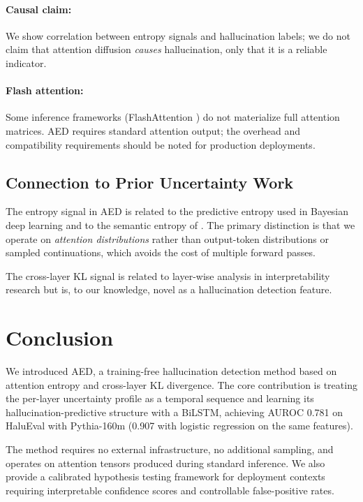 \documentclass[11pt]{article}
\begin{document}
\paragraph{Causal claim:}
We show correlation between entropy signals and hallucination labels; 
we do not claim that attention diffusion \emph{causes} hallucination, 
only that it is a reliable indicator.

\paragraph{Flash attention:}
Some inference frameworks (FlashAttention \citep{dao2022flashattention}) 
do not materialize full attention matrices. AED requires standard attention 
output; the overhead and compatibility requirements should be noted for 
production deployments.

\subsection{Connection to Prior Uncertainty Work}

The entropy signal in AED is related to the predictive entropy used in 
Bayesian deep learning \citep{gal2016dropout} and to the semantic entropy 
of \citet{kuhn2023semantic}. The primary distinction is that we operate on 
\emph{attention distributions} rather than output-token distributions or 
sampled continuations, which avoids the cost of multiple forward passes.

The cross-layer KL signal is related to layer-wise analysis in interpretability 
research \citep{tenney2019bert, elhage2021mathematical} but is, to our 
knowledge, novel as a hallucination detection feature.

\section{Conclusion}

We introduced AED, a training-free hallucination detection method based on 
attention entropy and cross-layer KL divergence.
The core contribution is treating the per-layer uncertainty profile as a 
temporal sequence and learning its hallucination-predictive structure with a 
BiLSTM, achieving AUROC 0.781 on HaluEval with Pythia-160m (0.907 
with logistic regression on the same features).

The method requires no external infrastructure, no additional sampling, and 
operates on attention tensors produced during standard inference.
We also provide a calibrated hypothesis testing framework for deployment 
contexts requiring interpretable confidence scores and controllable 
false-positive rates.
\end{document}
